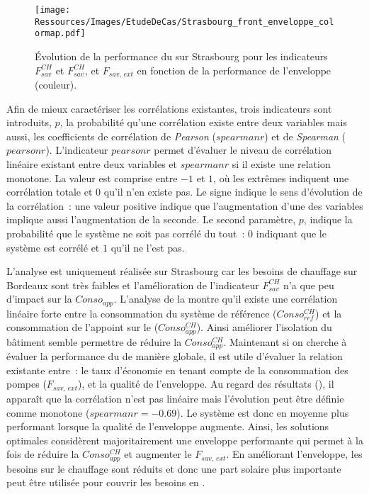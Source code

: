 \begin{figure}
    \centering
    \texttt{[image: Ressources/Images/EtudeDeCas/Strasbourg\_front\_enveloppe\_colormap.pdf]}
    \caption[Évolution de la performance du  en fonction de la qualité de l’enveloppe]
             {Évolution de la performance du  sur Strasbourg pour les indicateurs $F_{sav}^{CH}$
              et $F_{sav}^{CH}$, et $F_{sav,\,ext}$ en fonction de la performance de l’enveloppe (couleur).}
    \label{fig:pareto_enveloppe_strasbourg}
\end{figure}


Afin de mieux caractériser les corrélations existantes, trois indicateurs sont introduits,
$p$, la probabilité qu’une corrélation existe entre deux variables mais aussi, les
coefficients de corrélation de \textit{Pearson} ($spearmanr$) et de \textit{Spearman}
($pearsonr$). L’indicateur $pearsonr$ permet d’évaluer le niveau de corrélation linéaire
existant entre deux variables et $spearmanr$ si il existe une relation monotone. La valeur
est comprise entre $-1$ et $1$, où les extrêmes indiquent une corrélation totale et $0$
qu’il n’en existe pas. Le signe indique le sens d’évolution de la corrélation~: une
valeur positive indique que l’augmentation d’une des variables implique aussi
l’augmentation de la seconde. Le second paramètre, $p$, indique la probabilité que le
système ne soit pas corrélé du tout~: $0$ indiquant que le système est corrélé et $1$ qu’il
ne l’est pas.

L’analyse est uniquement réalisée sur Strasbourg car les besoins de chauffage sur Bordeaux
sont très faibles et l’amélioration de l’indicateur $F_{sav}^{CH}$ n’a que peu d’impact sur
la $Conso_{app}$. L’analyse de la  montre qu’il existe une
corrélation linéaire forte entre la
consommation du système de référence ($Conso_{ref}^{CH}$) et la consommation de l’appoint sur
le  ($Conso_{app}^{CH}$). Ainsi améliorer l’isolation du bâtiment semble permettre
de réduire la $Conso_{app}^{CH}$. Maintenant si on cherche à évaluer la performance du
 de manière globale, il est utile d’évaluer la relation existante entre~:
le taux d’économie en tenant compte de la consommation des pompes ($F_{sav,\,ext}$), et
la qualité de l’enveloppe. Au regard des résultats (),
il apparaît que la corrélation n’est pas linéaire mais l’évolution peut être définie
comme monotone ($spearmanr = \num{-0.69}$). Le système est donc en moyenne plus performant
lorsque la qualité de l’enveloppe augmente. Ainsi, les solutions optimales
considèrent majoritairement une enveloppe performante qui permet à la fois de réduire
la $Conso_{app}^{CH}$ et augmenter le $F_{sav,\,ext}$. En améliorant l’enveloppe, les besoins
sur le chauffage sont réduits et donc une part solaire plus importante peut être
utilisée pour couvrir les besoins en .


